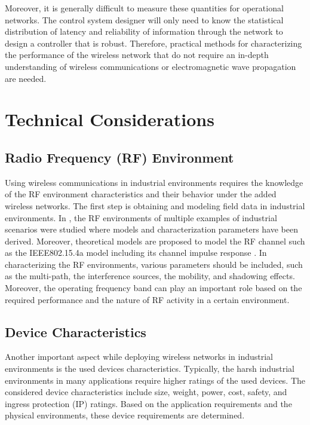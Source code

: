 Moreover, it is generally difficult to measure these quantities for operational networks. The control system designer will only need to know the statistical distribution of latency and reliability of information through the network to design a controller that is robust. Therefore, practical methods for characterizing the performance of the wireless network that do not require an in-depth understanding of wireless communications or electromagnetic wave propagation are needed.
    
    \section{Technical Considerations}

    \subsection{Radio Frequency (RF) Environment}
   Using wireless communications in industrial environments requires the knowledge of the RF environment characteristics and their behavior under the added wireless networks. The first step is obtaining and modeling field data in industrial environments. In \cite{Candell2017}, the RF environments of multiple examples of industrial scenarios were studied where models and characterization parameters have been derived. Moreover, theoretical models are proposed to model the RF channel such as the IEEE802.15.4a model including its channel impulse response \cite{A.F.Molisch2004}. In characterizing the RF environments, various parameters should be included, such as the multi-path, the interference sources, the mobility, and shadowing effects. Moreover, the operating frequency band can play an important role based on the required performance and the nature of RF activity in a certain environment.
   
    
    \subsection{Device Characteristics}  
Another important aspect while deploying wireless networks in industrial environments is the used devices characteristics. Typically, the harsh industrial environments in many applications require higher ratings of the used devices. The considered device characteristics include size, weight, power, cost, safety, and ingress protection (IP) ratings. Based on the application requirements and the physical environments, these device requirements are determined.



